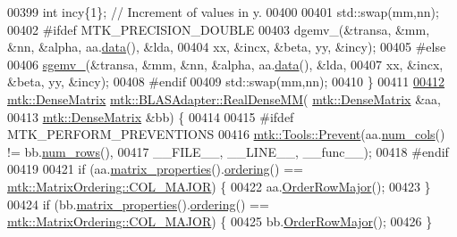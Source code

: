 \begin{DoxyCode}
00399   \textcolor{keywordtype}{int} incy\{1\};                            \textcolor{comment}{// Increment of values in y.}
00400 
00401   std::swap(mm,nn);
00402 \textcolor{preprocessor}{  #ifdef MTK\_PRECISION\_DOUBLE}
00403   dgemv\_(&transa, &mm, &nn, &alpha, aa.\hyperlink{classmtk_1_1DenseMatrix_a0c33b8a9e01d157c61ddbdf807c25d84}{data}(), &lda,
00404          xx, &incx, &beta, yy, &incy);
00405 \textcolor{preprocessor}{  #else}
00406   \hyperlink{namespacemtk_a88daff7ad6f251a58b94aa2d0c94d069}{sgemv\_}(&transa, &mm, &nn, &alpha, aa.\hyperlink{classmtk_1_1DenseMatrix_a0c33b8a9e01d157c61ddbdf807c25d84}{data}(), &lda,
00407         xx, &incx, &beta, yy, &incy);
00408 \textcolor{preprocessor}{  #endif}
00409   std::swap(mm,nn);
00410 \}
00411 
\hypertarget{mtk__blas__adapter_8cc_source_l00412}{}\hyperlink{classmtk_1_1BLASAdapter_acebd0e9bfe0bdd609c7fbea98ccfd3b5}{00412} \hyperlink{classmtk_1_1DenseMatrix}{mtk::DenseMatrix} \hyperlink{classmtk_1_1BLASAdapter_acebd0e9bfe0bdd609c7fbea98ccfd3b5}{mtk::BLASAdapter::RealDenseMM}(
      \hyperlink{classmtk_1_1DenseMatrix}{mtk::DenseMatrix} &aa,
00413                                                \hyperlink{classmtk_1_1DenseMatrix}{mtk::DenseMatrix} &bb) \{
00414 
00415 \textcolor{preprocessor}{  #ifdef MTK\_PERFORM\_PREVENTIONS}
00416   \hyperlink{classmtk_1_1Tools_a332324c6f25e66be9dff48c5987a3b9f}{mtk::Tools::Prevent}(aa.\hyperlink{classmtk_1_1DenseMatrix_a41747502d468c6728a4be31501b16e0e}{num\_cols}() != bb.\hyperlink{classmtk_1_1DenseMatrix_a53f3afb3b6a8d21854458aaa9663cc74}{num\_rows}(),
00417                       \_\_FILE\_\_, \_\_LINE\_\_, \_\_func\_\_);
00418 \textcolor{preprocessor}{  #endif}
00419 
00421   \textcolor{keywordflow}{if} (aa.\hyperlink{classmtk_1_1DenseMatrix_a5aa83a0643f27a4652ea97630edf7143}{matrix\_properties}().\hyperlink{classmtk_1_1Matrix_a13cd17621652cd5551ff98549bd94df7}{ordering}() == 
      \hyperlink{namespacemtk_ga622801bd9f912d0f976c3e383f5f581ca34d2765ffc490951febdcca04bc4f7cd}{mtk::MatrixOrdering::COL\_MAJOR}) \{
00422     aa.\hyperlink{classmtk_1_1DenseMatrix_ac2949efba3e8278335d45418c85433e4}{OrderRowMajor}();
00423   \}
00424   \textcolor{keywordflow}{if} (bb.\hyperlink{classmtk_1_1DenseMatrix_a5aa83a0643f27a4652ea97630edf7143}{matrix\_properties}().\hyperlink{classmtk_1_1Matrix_a13cd17621652cd5551ff98549bd94df7}{ordering}() == 
      \hyperlink{namespacemtk_ga622801bd9f912d0f976c3e383f5f581ca34d2765ffc490951febdcca04bc4f7cd}{mtk::MatrixOrdering::COL\_MAJOR}) \{
00425     bb.\hyperlink{classmtk_1_1DenseMatrix_ac2949efba3e8278335d45418c85433e4}{OrderRowMajor}();
00426   \}

\end{DoxyCode}
